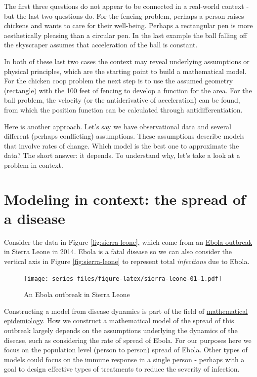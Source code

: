 \documentclass[
]{book}
\theoremstyle{definition}
\theoremstyle{definition}
\theoremstyle{definition}
\theoremstyle{remark}
\begin{document}
The first three questions do not appear to be connected in a real-world context - but the last two questions do. For the fencing problem, perhaps a person raises chickens and wants to care for their well-being. Perhaps a rectangular pen is more aesthetically pleasing than a circular pen. In the last example the ball falling off the skyscraper assumes that acceleration of the ball is constant.

In both of these last two cases the context may reveal underlying assumptions or physical principles, which are the starting point to build a mathematical model. For the chicken coop problem the next step is to use the assumed geometry (rectangle) with the 100 feet of fencing to develop a function for the area. For the ball problem, the velocity (or the antiderivative of acceleration) can be found, from which the position function can be calculated through antidifferentiation.

Here is another approach. Let's say we have observational data and several different (perhaps conflicting) assumptions. These assumptions describe models that involve rates of change. Which model is the best one to approximate the data? The short answer: it depends. To understand why, let's take a look at a problem in context.

\hypertarget{modeling-in-context-the-spread-of-a-disease}{%
\section{Modeling in context: the spread of a disease}\label{modeling-in-context-the-spread-of-a-disease}}

Consider the data in Figure \ref{fig:sierra-leone}, which come from an \href{https://www.cdc.gov/vhf/ebola/history/2014-2016-outbreak/index.html}{Ebola outbreak} in Sierra Leone in 2014. Ebola is a fatal disease so we can also consider the vertical axis in Figure \ref{fig:sierra-leone} to represent total \emph{infections} due to Ebola.

\begin{figure}
\centering
\texttt{[image: series\_files/figure-latex/sierra-leone-01-1.pdf]}
\caption{\label{fig:sierra-leone-01}An Ebola outbreak in Sierra Leone}
\end{figure}

Constructing a model from disease dynamics is part of the field of \href{https://en.wikipedia.org/wiki/Mathematical_modelling_of_infectious_disease}{mathematical epidemiology}. How we construct a mathematical model of the spread of this outbreak largely depends on the assumptions underlying the dynamics of the disease, such as considering the rate of spread of Ebola. For our purposes here we focus on the population level (person to person) spread of Ebola. Other types of models could focus on the immune response in a single person - perhaps with a goal to design effective types of treatments to reduce the severity of infection.
\end{document}
